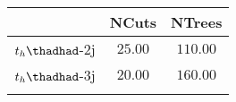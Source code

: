 \centering
\begin{tabular}{ccc} \toprule\toprule
 & NCuts & NTrees\\\midrule
$t_{h}\thadhad$-2j & $25.00$ & $110.00$\\
$t_{h}\thadhad$-3j & $20.00$ & $160.00$\\
\bottomrule\bottomrule\\
\end{tabular}
